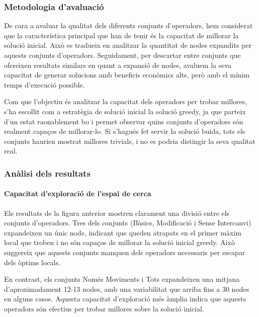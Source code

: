\subsubsection{Metodologia d'avaluació}

De cara a avaluar la qualitat dels diferents conjunts d'operadors, hem considerat que la característica principal que han de tenir és la capacitat de millorar la solució inicial. Això es tradueix en analitzar la quantitat de nodes expandits per aquests conjunts d'operadors. Seguidament, per descartar entre conjunts que ofereixen resultats similars en quant a expansió de nodes, avaluem la seva capacitat de generar solucions amb beneficis econòmics alts, però amb el mínim temps d'execució possible.

\vspace{0.2cm}

Com que l'objectiu és analitzar la capacitat dels operadors per trobar millores, s'ha escollit com a estratègia de solució inicial la solució greedy, ja que parteix d'un estat raonablement bo i permet observar quins conjunts d'operadors són realment capaços de millorar-lo. Si s'hagués fet servir la solució buida, tots els conjunts haurien mostrat millores trivials, i no es podria distingir la seva qualitat real.

\subsubsection{Anàlisi dels resultats}

\paragraph{Capacitat d'exploració de l'espai de cerca}

\vspace{0.5cm}

\vspace{0.5cm}

Els resultats de la figura anterior mostren clarament una divisió entre els conjunts d'operadors. Tres dels conjunts (Bàsics, Modificació i Sense Intercanvi) expandeixen un únic node, indicant que queden atrapats en el primer màxim local que troben i no són capaços de millorar la solució inicial greedy. Això suggereix que aquests conjunts manquen dels operadors necessaris per escapar dels òptims locals.

En contrast, els conjunts Només Moviments i Tots expandeixen una mitjana d'aproximadament 12-13 nodes, amb una variabilitat que arriba fins a 30 nodes en alguns casos. Aquesta capacitat d'exploració més àmplia indica que aquests operadors són efectius per trobar millores sobre la solució inicial.

